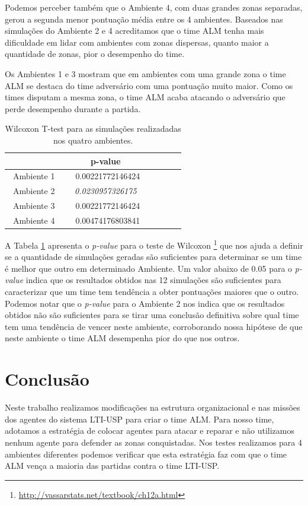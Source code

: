 \documentclass{llncs}
\begin{document}
Podemos perceber também que o Ambiente 4, com duas grandes zonas separadas, gerou a segunda menor pontuação média entre os 4 ambientes. Baseados nas simulações do Ambiente 2 e 4 acreditamos que o time ALM tenha mais dificuldade em lidar com ambientes com zonas dispersas, quanto maior a quantidade de zonas, pior o desempenho do time.

Os Ambientes 1 e 3 mostram que em ambientes com uma grande zona o time ALM se destaca do time adversário com uma pontuação muito maior. Como os times disputam a mesma zona, o time ALM acaba atacando o adversário que perde desempenho durante a partida.

\begin{table}
  \centering
  \begin{tabular}{|c|c|c|c|c|c|}
    \hline
               & p-value \\ \hline
    ~Ambiente 1~ & ~~0.00221772146424~ \\ \hline
    ~Ambiente 2~ & \textit{0.0230957326175} \\ \hline
    ~Ambiente 3~ & ~~0.00221772146424~ \\ \hline
    ~Ambiente 4~ & ~~0.00474176803841~ \\ \hline
  \end{tabular}
  \caption{Wilcoxon T-test para as simulações realizadadas nos quatro ambientes.}
  \label{table:wilcoxon}
\end{table}

A Tabela \ref{table:wilcoxon} apresenta o \textit{p-value} para o teste de Wilcoxon \footnote{\url{http://vassarstats.net/textbook/ch12a.html}} que nos ajuda a definir se a quantidade de simulações geradas são suficientes para determinar se um time é melhor que outro em determinado Ambiente. Um valor abaixo de 0.05 para o \textit{p-value} indica que os resultados obtidos nas 12 simulações são suficientes para caracterizar que um time tem tendência a obter pontuações maiores que o outro. Podemos notar que o \textit{p-value} para o Ambiente 2 nos indica que os resultados obtidos não são suficientes para se tirar uma conclusão definitiva sobre qual time tem uma tendência de vencer neste ambiente, corroborando nossa hipótese de que neste ambiente o time ALM desempenha pior do que nos outros.

\section{Conclusão}

Neste trabalho realizamos modificações na estrutura organizacional e nas missões dos agentes do sistema LTI-USP para criar o time ALM. Para nosso time, adotamos a estratégia de colocar agentes para atacar e reparar e não utilizamos nenhum agente para defender as zonas conquistadas. Nos testes realizamos para 4 ambientes diferentes podemos verificar que esta estratégia faz com que o time ALM vença a maioria das partidas contra o time LTI-USP.
\end{document}
